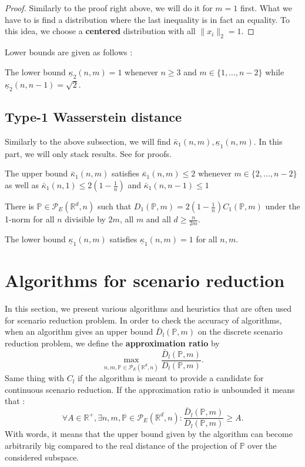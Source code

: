 \documentclass{amsart}
\newcommand{\RR}{\mathbb{R}}
\begin{document}
\begin{proof}
    Similarly to the proof right above, we will do it for $m=1$ first. What we have to is find a distribution where the last inequality is in fact an equality. To this idea, we choose a \textbf{centered} distribution with all $\lVert x_i\rVert_2=1$.
\end{proof}
Lower bounds are given as follows : 
\begin{proposition}
    The lower bound $\underline\kappa_2\left(n,m\right)=1$ whenever $n\geq3$ and $m\in\{1,...,n-2\}$ while $\underline\kappa_2\left(n,n-1\right)=\sqrt{2}.$
\end{proposition}
\subsection{Type-1 Wasserstein distance}
Similarly to the above subsection, we will find $\bar{\kappa}_1\left(n,m\right), \underline\kappa_1\left(n,m\right)$. In this part, we will only stack results. See \cite[Section 3.2]{rujeerapaiboon_scenario_2022} for proofs.
\begin{theorem}
    The upper bound $\bar\kappa_1\left(n,m\right)$ satisfies $\bar\kappa_1\left(n,m\right)\leq2$ whenever $m\in\{2,...,n-2\}$ as well as $\bar\kappa_1\left(n,1\right)\leq2\left(1-\frac{1}{n}\right)$ and $\bar\kappa_1\left(n,n-1\right)\leq1$
\end{theorem}
\begin{proposition}
    There is $\mathbb{P}\in\mathcal{P}_E\left(\RR^d,n\right)$ such that $D_1\left(\mathbb{P},m\right)=2\left(1-\frac{1}{n}\right)C_1\left(\mathbb{P},m\right)$ under the 1-norm for all $n$ divisible by $2m$, all $m$ and all $d\geq \frac{n}{2m}$.
\end{proposition}
\begin{proposition}
    The lower bound $\underline{\kappa}_1\left(n,m\right)$ satisfies $\underline{\kappa}_1\left(n,m\right)=1$ for all $n, m$.
\end{proposition}

\section{Algorithms for scenario reduction}
In this section, we present various algorithms and heuristics that are often used for scenario reduction problem. In order to check the accuracy of algorithms, when an algorithm gives an upper bound $\bar{D}_l\left(\mathbb{P},m\right)$ on the discrete scenario reduction problem, we define the \textbf{approximation ratio} by 
$$
\max_{n,m,\mathbb{P}\in\mathcal{P}_E(\RR^d,n)}\frac{\bar{D}_l\left(\mathbb{P},m\right)}{D_l\left(\mathbb{P},m\right)}.
$$
Same thing with $C_l$ if the algorithm is meant to provide a candidate for continuous scenario reduction. If the approximation ratio is unbounded it means that :
$$\forall A\in\RR^+, \exists n,m,\mathbb{P}\in\mathcal{P}_E\left(\RR^d,n\right) : \frac{\bar{D}_l\left(\mathbb{P},m\right)}{D_l\left(\mathbb{P},m\right)}\geq A.$$
With words, it means that the upper bound given by the algorithm can become arbitrarily big compared to the real distance of the projection of $\mathbb{P}$ over the considered subspace.
\end{document}

